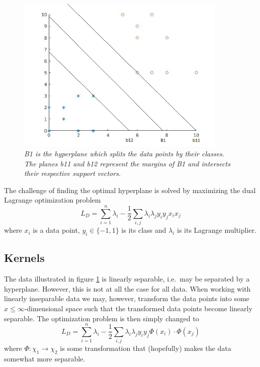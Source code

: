 \documentclass{article}
\begin{document}
\begin{figure}[H]
	\centering
	\includegraphics[width=10cm]{svm_plot}
	\caption{\textit{B1 is the hyperplane which splits the data points by their classes. The planes b11 and b12 represent the margins of B1 and intersects their respective support vectors.}}
	\label{fig:hyperplane}
\end{figure}

The challenge of finding the optimal hyperplane is solved by maximizing the dual Lagrange optimization problem
\begin{equation}
\label{eq:dual_lagrange_problem}
L_D = \sum_{i=1}^{n}\lambda_i-\frac{1}{2}\sum_{i,j}\lambda_i\lambda_j y_iy_j x_ix_j
\end{equation}
where $x_i$ is a data point, $y_i\in \{-1, 1\}$ is its class and $\lambda_i$ is its Lagrange multiplier.

\subsection{Kernels}
The data illustrated in figure \ref{fig:hyperplane} is linearly separable, i.e.\ may be separated by a hyperplane. However, this is not at all the case for all data. When working with linearly inseparable data we may, however, transform the data points into some $x\leq\infty$-dimensional space such that the transformed data points become linearly separable. The optimization problem is then simply changed to
\begin{equation}
\label{eq:kernel_function_phi}
L_D = \sum_{i=1}^{n}\lambda_i-\frac{1}{2}\sum_{i,j}\lambda_i\lambda_j y_iy_j\Phi(x_i)\cdot\Phi(x_j)
\end{equation}
where $\Phi:\chi_1\rightarrow\chi_2$ is some transformation that (hopefully) makes the data somewhat more separable.
\end{document}
